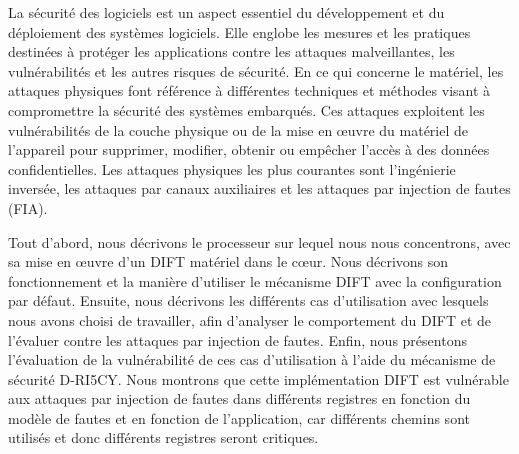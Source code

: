 La sécurité des logiciels est un aspect essentiel du développement et du déploiement des systèmes logiciels. Elle englobe les mesures et les pratiques destinées à protéger les applications contre les attaques malveillantes, les vulnérabilités et les autres risques de sécurité.
En ce qui concerne le matériel, les attaques physiques font référence à différentes techniques et méthodes visant à compromettre la sécurité des systèmes embarqués. Ces attaques exploitent les vulnérabilités de la couche physique ou de la mise en œuvre du matériel de l'appareil pour supprimer, modifier, obtenir ou empêcher l'accès à des données confidentielles.
Les attaques physiques les plus courantes sont l'ingénierie inversée, les attaques par canaux auxiliaires et les attaques par injection de fautes (FIA).

Tout d'abord, nous décrivons le processeur sur lequel nous nous concentrons, avec sa mise en œuvre d'un DIFT matériel dans le cœur. Nous décrivons son fonctionnement et la manière d'utiliser le mécanisme DIFT avec la configuration par défaut. Ensuite, nous décrivons les différents cas d'utilisation avec lesquels nous avons choisi de travailler, afin d'analyser le comportement du DIFT et de l'évaluer contre les attaques par injection de fautes. Enfin, nous présentons l'évaluation de la vulnérabilité de ces cas d'utilisation à l'aide du mécanisme de sécurité D-RI5CY. Nous montrons que cette implémentation DIFT est vulnérable aux attaques par injection de fautes dans différents registres en fonction du modèle de fautes et en fonction de l'application, car différents chemins sont utilisés et donc différents registres seront critiques.